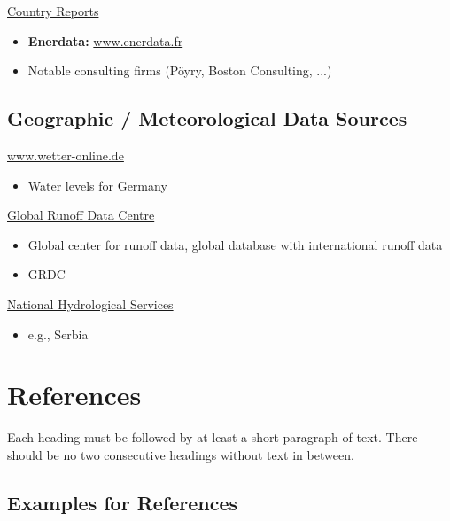 \documentclass[a4paper, fleqn, headsepline, footsepline, 12pt, parskip=half]{scrartcl}
\begin{document}
\underline{Country Reports}
\begin{itemize}
    \item \textbf{Enerdata:} \url{www.enerdata.fr}
    \item Notable consulting firms (Pöyry, Boston Consulting, ...)
\end{itemize}


\subsection{Geographic / Meteorological Data Sources}
\label{sec:geographicMeteorologicalDataSources}

\underline{www.wetter-online.de}
\begin{itemize}
    \item Water levels for Germany
\end{itemize}

\underline{Global Runoff Data Centre}
\begin{itemize}
    \item Global center for runoff data, global database with international runoff data
    \item GRDC
\end{itemize}

\underline{National Hydrological Services}
\begin{itemize}
    \item e.g., Serbia
\end{itemize}


\newpage
\section{References}
\label{sec:references}

Each heading must be followed by at least a short paragraph of text. There should be no two consecutive headings without text in between.


\subsection{Examples for References}
\label{sec:examplesForReferences}
\end{document}
